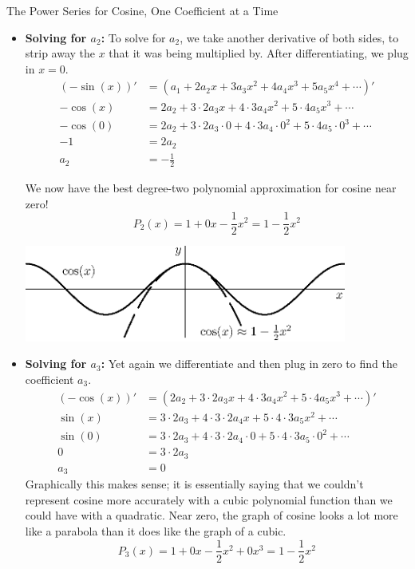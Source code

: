 \begin{example}{The Power Series for Cosine, One Coefficient at a Time}
\begin{itemize}
Thus, the best  to cosine is $P_1(x)=1+0x=1$.  Notice this is no different from the degree zero approximation, and notice this is also identical to our definition of tangent line from Calculus I!

\item {\bf Solving for $a_2$:} To solve for $a_2$, we take another derivative of both sides, to strip away the $x$ that it was being multiplied by.  After differentiating, we plug in $x=0$. 
\begin{align*}
\left(-\sin(x)\right)'&=\left(a_1+2a_2x+3a_3x^2+4a_4x^3+5  a_5 x^4+\cdots\right)' \\
-\cos(x)&=2a_2+3\cdot 2a_3x+4\cdot 3 a_4x^2+5\cdot 4  a_5 x^3+\cdots \\
-\cos(0)&=2a_2+3\cdot 2a_3\cdot 0+4\cdot 3 a_4\cdot 0^2+5\cdot 4  a_5\cdot 0^3+\cdots \\
-1&=2a_2 \\
a_2&=-\frac{1}{2} 
\end{align*}

We now have the best degree-two polynomial approximation for cosine near zero! $$P_2(x)=1+0x-\frac{1}{2}x^2 =1-\frac{1}{2}x^2$$

	\begin{center}
		\includegraphics[width=300pt]{ChapterPowerSeries/Figures/cosdeg2.eps}
	\end{center}

\item {\bf Solving for $a_3$:} Yet again we differentiate and then plug in zero to find the coefficient $a_3$.
\begin{align*}
\left(-\cos(x)\right)'&=\left(2a_2+3\cdot 2a_3x+4\cdot 3 a_4x^2+5\cdot 4  a_5 x^3+\cdots\right)' \\
\sin(x)&=3\cdot 2a_3+4\cdot 3\cdot 2 a_4x+5\cdot 4 \cdot  3 a_5 x^2+\cdots \\
\sin(0)&=3\cdot 2a_3+4\cdot 3\cdot 2 a_4\cdot 0+5\cdot 4 \cdot  3 a_5\cdot  0^2+\cdots  \\
0&=3\cdot 2a_3 \\
a_3&=0 
\end{align*}
Graphically this makes sense; it is essentially saying that we couldn't represent cosine more accurately with a cubic polynomial function than we could have with a quadratic.  Near zero, the graph of cosine looks a lot more like a parabola than it does like the graph of a cubic.
 $$P_3(x)=1+0x-\frac{1}{2}x^2+0x^3 =1-\frac{1}{2}x^2$$


\end{itemize}
\end{example}
